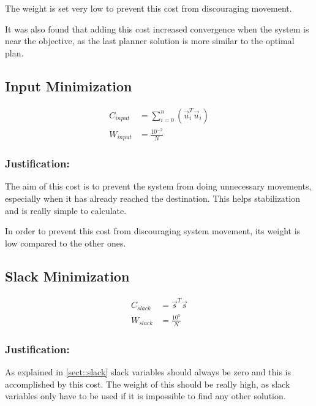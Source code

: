 The weight is set very low to prevent this cost from discouraging movement.

It was also found that adding this cost increased convergence when the system is near the objective, as the last planner solution is more similar to the optimal plan.



\subsection{Input Minimization}
\begin{align}
C_{input} &=
\sum_{i=0}^{n}\left(
\vec u_i^T
\vec u_i \right)\\
W_{input} &=
\frac{10^{-2}}{N}
\end{align}

\subsubsection{Justification:}
The aim of this cost is to prevent the system from doing unnecessary movements, especially when it has already reached the destination. This helps stabilization and is really simple to calculate.

In order to prevent this cost from discouraging system movement, its weight is low compared to the other ones.


\subsection{Slack Minimization}
\begin{align}
C_{slack} &=
\vec{s}^T
\vec{s} \\
W_{slack} &=
\frac{10^{5}}{N}
\end{align}

\subsubsection{Justification:}
As explained in \cref{sect::slack} slack variables  should always be zero and this is accomplished by this cost. The weight of this should be really high, as slack variables only have to be used if it is impossible to find any other solution.
